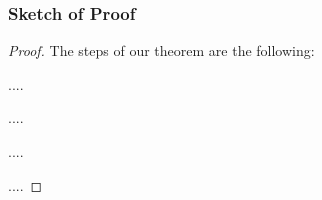 \documentclass[xcolor=dvipsnames]{beamer}
\begin{document}
\begin{frame}
\frametitle{Sketch of Proof}

\begin{proof}
The steps of our theorem are the following:

\textcolor[rgb]{1.00,0.00,1.00}{} ....

\textcolor[rgb]{1.00,0.00,1.00}{} ....

\textcolor[rgb]{1.00,0.00,1.00}{} ....

\textcolor[rgb]{1.00,0.00,1.00}{} ....

\end{proof}
\end{frame}
\end{document}
